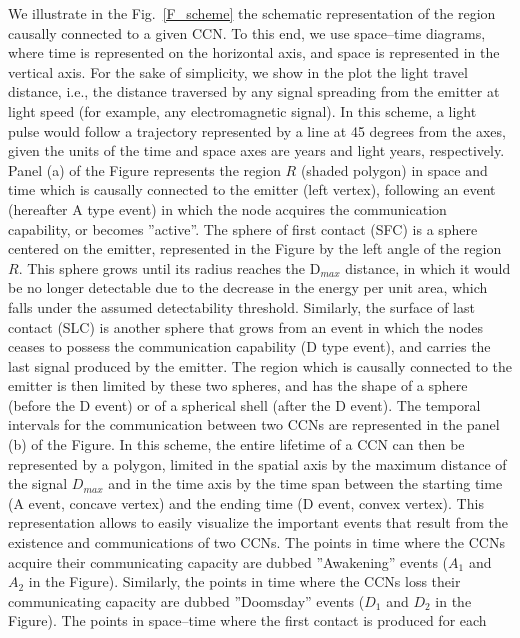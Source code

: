 \documentclass[crop]{CSLB}
\newcommand{\ceti}{CCN}
\newcommand{\cetis}{CCNs}
\newcommand{\ffn}[1]{}
\begin{document}
\ffn{1} We illustrate in the Fig.~\ref{F_scheme} the schematic
representation of the region causally connected to a given \ceti{}.
%
To this end, we use space--time diagrams, where time is represented on
the horizontal axis, and space is represented in the vertical axis.
%
For the sake of simplicity, we show in the plot the light travel
distance, i.e., the distance traversed by any signal spreading from
the emitter at light speed (for example, any electromagnetic signal).
%
In this scheme, a light pulse would follow a trajectory represented by
a line at 45 degrees from the axes, given the units of the time and
space axes are years and light years, respectively.
%
Panel (a) of the Figure represents the region $R$ (shaded polygon) in
space and time which is causally connected to the emitter (left
vertex), following an event (hereafter A type event) in which the node
acquires the communication capability, or becomes ''active''.
%
The sphere of first contact (SFC) is a sphere centered on the emitter,
represented in the Figure by the left angle of the region $R$.
%
This sphere grows until its radius reaches the D$_{max}$ distance, in
which it would be no longer detectable due to the decrease in the
energy per unit area, which falls under the assumed detectability
threshold.
%
Similarly, the surface of last contact (SLC) is another sphere that
grows from an event in which the nodes ceases to possess the
communication capability (D type event), and carries the last signal
produced by the emitter.
%
The region which is causally connected to the emitter is then limited
by these two spheres, and has the shape of a sphere (before the D
event) or of a spherical shell (after the D event).
%
The temporal intervals for the communication between two \cetis{} are
represented in the panel (b) of the Figure.
%
In this scheme, the entire lifetime of a \ceti{} can then be
represented by a polygon, limited in the spatial axis by the maximum
distance of the signal $D_{max}$ and in the time axis by the time span
between the starting time (A event, concave vertex) and the ending
time (D event, convex vertex).
%
This representation allows to easily visualize the important events
that result from the existence and communications of two \cetis{}.
%
The points in time where the \cetis{} acquire their communicating
capacity are dubbed ''Awakening'' events ($A_1$ and $A_2$ in the
Figure).
%
Similarly, the points in time where the \cetis{} loss their
communicating capacity are dubbed ''Doomsday'' events ($D_1$ and $D_2$
in the Figure).
%
The points in space--time where the first contact is produced for each
\end{document}
